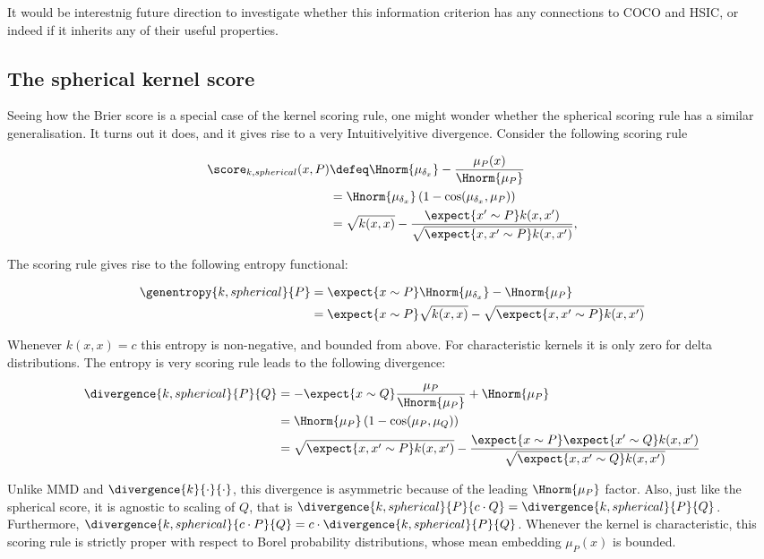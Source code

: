 It would be interestnig future direction to investigate whether this information criterion has any connections to COCO and HSIC, or indeed if it inherits any of their useful properties.

\subsection{The spherical kernel score}

Seeing how the Brier score is a special case of the kernel scoring rule, one might wonder whether the spherical scoring rule has a similar generalisation. It turns out it does, and it gives rise to a very Intuitivelyitive divergence. Consider the following scoring rule

\begin{align}
	\score_{k,spherical}(x,P) &\defeq \Hnorm{\mu_{\delta_x}} - \frac{\mu_P(x)}{\Hnorm{\mu_P}}\\
			& = \Hnorm{\mu_{\delta_x}}\left(1 - \cos(\mu_{\delta_x},\mu_{P})\right)\\
		& =\sqrt{k(x,x)} - \frac{\expect{x'\sim P}k(x,x')}{\sqrt{\expect{x,x'\sim P}k(x,x')}},
\end{align}

The scoring rule gives rise to the following entropy functional:

\begin{align}
	\genentropy{k,spherical}{P} & = \expect{x\sim P}\Hnorm{\mu_{\delta_x}} - \Hnorm{\mu_P}\\
		& = \expect{x\sim P}\sqrt{k(x,x)} - \sqrt{\expect{x,x'\sim P}k(x,x')}
\end{align}

Whenever $k(x,x)=c$ this entropy is non-negative, and bounded from above. For characteristic kernels it is only zero for delta distributions. The entropy is very scoring rule leads to the following divergence:

\begin{align}
	\divergence{k,spherical}{P}{Q} &= - \expect{x\sim Q}\frac{\mu_P}{\Hnorm{\mu_P}} + \Hnorm{\mu_P}\\
		&= \Hnorm{\mu_P} \left( 1 - \cos(\mu_P, \mu_Q)\right)\\
		&= \sqrt{\expect{x,x'\sim P}k(x,x')} - \frac{\expect{x\sim P}\expect{x'\sim Q}k(x,x')}{\sqrt{\expect{x,x'\sim Q}k(x,x')}} \label{eqn:spherical_kernel_divergence}
\end{align}

Unlike MMD and $\divergence{k}{\cdot}{\cdot}$, this divergence is asymmetric because of the leading $\Hnorm{\mu_P}$ factor. Also, just like the spherical score, it is agnostic to scaling of $Q$, that is $\divergence{k,spherical}{P}{c\cdot Q} = \divergence{k,spherical}{P}{Q}$. Furthermore, $\divergence{k,spherical}{c\cdot P}{Q} = c \cdot \divergence{k,spherical}{P}{Q}$. Whenever the kernel is characteristic, this scoring rule is strictly proper with respect to Borel probability distributions, whose mean embedding $\mu_P(x)$ is bounded.


